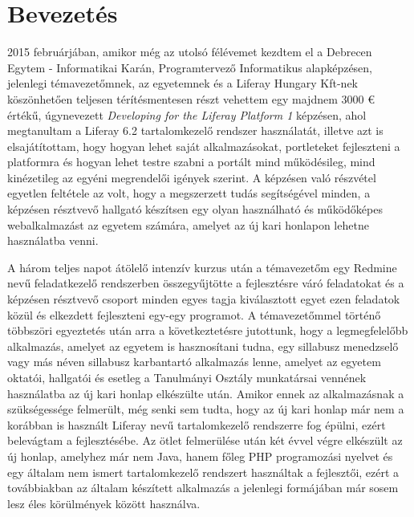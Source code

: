\documentclass[hidelinks, 12pt, a4paper]{report}
\begin{document}
\clearpage
\setcounter{page}{2}

\tableofcontents

\chapter{Bevezetés}

2015 februárjában, amikor még az utolsó félévemet kezdtem el a Debrecen Egytem - Informatikai Karán, Programtervező Informatikus alapképzésen, jelenlegi témavezetőmnek, az egyetemnek és a Liferay Hungary Kft-nek köszönhetően teljesen térítésmentesen részt vehettem egy majdnem 3000 € értékű, \cite{liferay-dev-1} úgynevezett \emph{Developing for the Liferay Platform 1} képzésen, ahol megtanultam a Liferay 6.2 tartalomkezelő rendszer \cite{liferay} használatát, illetve azt is elsajátítottam, hogy hogyan lehet saját alkalmazásokat, portleteket fejleszteni a platformra és hogyan lehet testre szabni a portált mind működésileg, mind kinézetileg az egyéni megrendelői igények szerint. A képzésen való részvétel egyetlen feltétele az volt, hogy a megszerzett tudás segítségével minden, a képzésen résztvevő hallgató készítsen egy olyan használható és működőképes webalkalmazást az egyetem számára, amelyet az új kari honlapon lehetne használatba venni.

A három teljes napot átölelő intenzív kurzus után a témavezetőm egy Redmine \cite{redmine} nevű feladatkezelő rendszerben összegyűjtötte a fejlesztésre váró feladatokat és a képzésen résztvevő csoport minden egyes tagja kiválasztott egyet ezen feladatok közül és elkezdett fejleszteni egy-egy programot. A témavezetőmmel történő többszöri egyeztetés után arra a következtetésre jutottunk, hogy a legmegfelelőbb alkalmazás, amelyet az egyetem is hasznosítani tudna, egy sillabusz menedzselő vagy más néven sillabusz karbantartó alkalmazás lenne, amelyet az egyetem oktatói, hallgatói és esetleg a Tanulmányi Osztály munkatársai vennének használatba az új kari honlap elkészülte után. Amikor ennek az alkalmazásnak a szükségessége felmerült, még senki sem tudta, hogy az új kari honlap már nem a korábban is használt Liferay nevű tartalomkezelő rendszerre fog épülni, ezért belevágtam a fejlesztésébe. Az ötlet felmerülése után két évvel végre elkészült az új honlap, amelyhez már nem Java, hanem főleg PHP programozási nyelvet és egy általam nem ismert tartalomkezelő rendszert használtak a fejlesztői, ezért a továbbiakban az általam készített alkalmazás a jelenlegi formájában már sosem lesz éles körülmények között használva.
\end{document}
